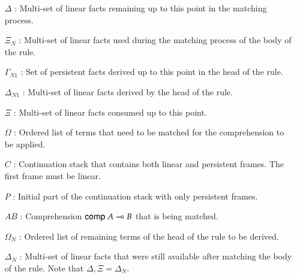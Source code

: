 \begin{enumerate}
   \item[$\Delta$]: Multi-set of linear facts remaining up to this point in the matching process.
   \item[$\Xi_N$]: Multi-set of linear facts used during the matching process of the body of the rule.
   \item[$\Gamma_{N1}$]: Set of persistent facts derived up to this point in the head of the rule.
   \item[$\Delta_{N1}$]: Multi-set of linear facts derived by the head of the rule.
   \item[$\Xi$]: Multi-set of linear facts consumed up to this point.
   \item[$\Omega$]: Ordered list of terms that need to be matched for the comprehension to be applied.
   \item[$C$]: Continuation stack that contains both linear and persistent frames. The first frame must be linear.
   \item[$P$]: Initial part of the continuation stack with only persistent frames.
   \item[$AB$]: Comprehension $\mathsf{comp} \; A \multimap B$ that is being matched.
   \item[$\Omega_N$]: Ordered list of remaining terms of the head of the rule to be derived.
   \item[$\Delta_N$]: Multi-set of linear facts that were still available after matching the body of the rule. Note that $\Delta, \Xi = \Delta_N$.
\end{enumerate}

